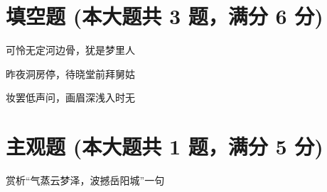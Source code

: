 \documentclass[12pt, a4paper, addpoints]{exam}
\begin{document}
\hspace{5cm}

\section{\normalsize{填空题 (本大题共 3 题，满分 6 分)}}
\hspace{1.5cm}
\begin{questions}
\question[2] 可怜无定河边骨，犹是\uline{\qquad\qquad\qquad\qquad}梦里人

\question[2] 昨夜洞房停\uline{\qquad\qquad\qquad\qquad}，待晓堂前拜舅姑

\question[2] 妆罢低声问\uline{\qquad\qquad\qquad\qquad}，画眉深浅入时无

\end{questions}

\hspace{5cm}

\section{\normalsize{主观题 (本大题共 1 题，满分 5 分)}}
\hspace{1.5cm}
\begin{questions}
\question[5] 赏析“气蒸云梦泽，波撼岳阳城”一句


\end{questions}
\end{document}
